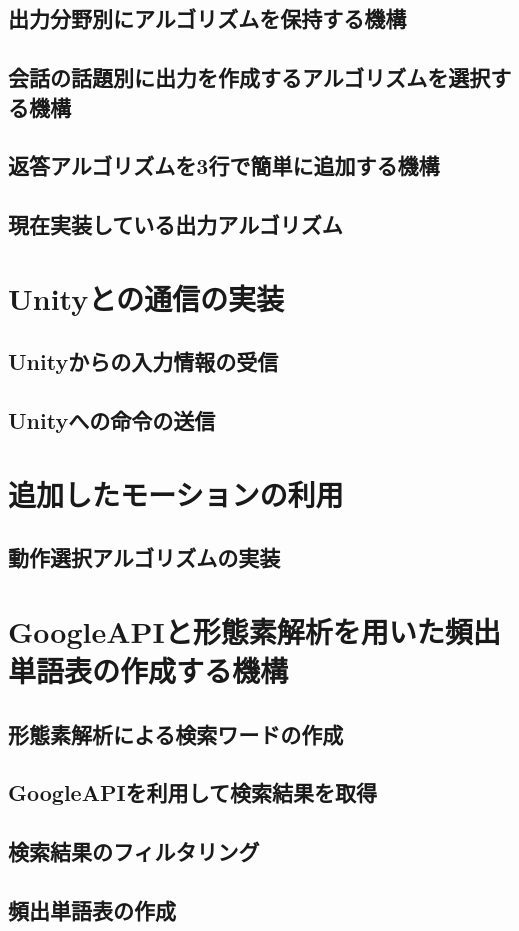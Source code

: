 \subsection{出力分野別にアルゴリズムを保持する機構}
\subsection{会話の話題別に出力を作成するアルゴリズムを選択する機構}
\subsection{返答アルゴリズムを3行で簡単に追加する機構}
\subsection{現在実装している出力アルゴリズム}


\section{Unityとの通信の実装}
\subsection{Unityからの入力情報の受信}
\subsection{Unityへの命令の送信}

\section{追加したモーションの利用}
\subsection{動作選択アルゴリズムの実装}

\section{GoogleAPIと形態素解析を用いた頻出単語表の作成する機構}
\subsection{形態素解析による検索ワードの作成}
\subsection{GoogleAPIを利用して検索結果を取得}
\subsection{検索結果のフィルタリング}
\subsection{頻出単語表の作成}



